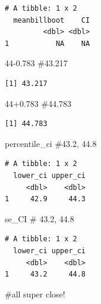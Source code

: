 \documentclass[
  letterpaper,
  DIV=11,
  numbers=noendperiod]{scrartcl}
\newenvironment{Shaded}{\begin{snugshade}}{\end{snugshade}}
\newcommand{\CommentTok}[1]{\textcolor[rgb]{0.37,0.37,0.37}{#1}}
\newcommand{\DecValTok}[1]{\textcolor[rgb]{0.68,0.00,0.00}{#1}}
\newcommand{\FloatTok}[1]{\textcolor[rgb]{0.68,0.00,0.00}{#1}}
\newcommand{\NormalTok}[1]{\textcolor[rgb]{0.00,0.23,0.31}{#1}}
\begin{document}
\begin{verbatim}
# A tibble: 1 x 2
  meanbillboot    CI
         <dbl> <dbl>
1           NA    NA
\end{verbatim}

\begin{Shaded}
\begin{Highlighting}[]
\DecValTok{44}\FloatTok{{-}0.783} \CommentTok{\#43.217}
\end{Highlighting}
\end{Shaded}

\begin{verbatim}
[1] 43.217
\end{verbatim}

\begin{Shaded}
\begin{Highlighting}[]
\DecValTok{44}\FloatTok{+0.783} \CommentTok{\#44.783}
\end{Highlighting}
\end{Shaded}

\begin{verbatim}
[1] 44.783
\end{verbatim}

\begin{Shaded}
\begin{Highlighting}[]
\NormalTok{percentile\_ci }\CommentTok{\#43.2, 44.8}
\end{Highlighting}
\end{Shaded}

\begin{verbatim}
# A tibble: 1 x 2
  lower_ci upper_ci
     <dbl>    <dbl>
1     42.9     44.3
\end{verbatim}

\begin{Shaded}
\begin{Highlighting}[]
\NormalTok{se\_CI }\CommentTok{\# 43.2, 44.8}
\end{Highlighting}
\end{Shaded}

\begin{verbatim}
# A tibble: 1 x 2
  lower_ci upper_ci
     <dbl>    <dbl>
1     43.2     44.8
\end{verbatim}

\begin{Shaded}
\begin{Highlighting}[]
\CommentTok{\#all super close!}
\end{Highlighting}
\end{Shaded}
\end{document}
